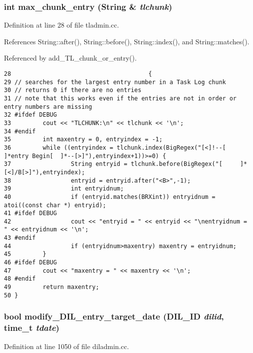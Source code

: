 \subsubsection{\setlength{\rightskip}{0pt plus 5cm}int max\_\-chunk\_\-entry ({\bf String} \& {\em tlchunk})}\label{dil2al_8hh_a317}




Definition at line 28 of file tladmin.cc.

References String::after(), String::before(), String::index(), and String::matches().

Referenced by add\_\-TL\_\-chunk\_\-or\_\-entry().



\footnotesize\begin{verbatim}28                                       {
29 // searches for the largest entry number in a Task Log chunk
30 // returns 0 if there are no entries
31 // note that this works even if the entries are not in order or entry numbers are missing
32 #ifdef DEBUG
33         cout << "TLCHUNK:\n" << tlchunk << '\n';
34 #endif
35         int maxentry = 0, entryindex = -1;
36         while ((entryindex = tlchunk.index(BigRegex("[<]!--[    ]*entry Begin[  ]*--[>]"),entryindex+1))>=0) {
37                 String entryid = tlchunk.before(BigRegex("[     ]*[<]/B[>]"),entryindex);
38                 entryid = entryid.after("<B>",-1);
39                 int entryidnum;
40                 if (entryid.matches(BRXint)) entryidnum = atoi((const char *) entryid);
41 #ifdef DEBUG
42                 cout << "entryid = " << entryid << "\nentryidnum = " << entryidnum << '\n';
43 #endif
44                 if (entryidnum>maxentry) maxentry = entryidnum;
45         }
46 #ifdef DEBUG
47         cout << "maxentry = " << maxentry << '\n';
48 #endif
49         return maxentry;
50 }
\end{verbatim}\normalsize 
{}
\subsubsection{\setlength{\rightskip}{0pt plus 5cm}bool modify\_\-DIL\_\-entry\_\-target\_\-date ({\bf DIL\_\-ID} {\em dilid}, time\_\-t {\em tdate})}\label{dil2al_8hh_a307}




Definition at line 1050 of file diladmin.cc.

